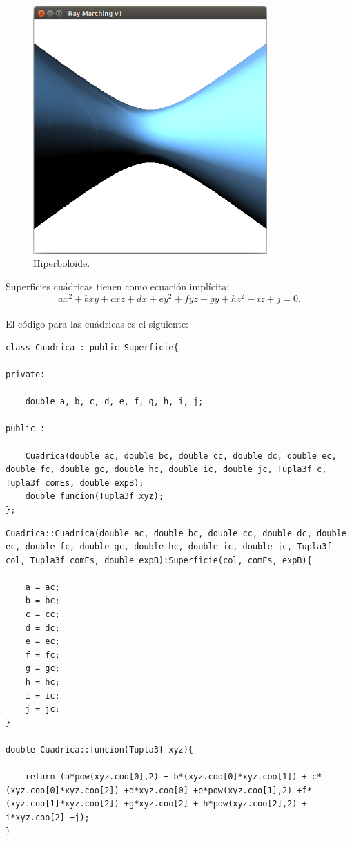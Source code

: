 \begin{figure}[h]
	\begin{center}
		\includegraphics[width=0.8\textwidth]{imagenes/cuadrica.png}
	\end{center}
	\caption{Hiperboloide.}
	\label{fig:etiq_123}
\end{figure}


Superficies cuádricas tienen como ecuación implícita:
${ }$\\
\[
ax^2 + bxy + cxz +dx +ey^2 +fyz +gy + hz^2 + iz +j = 0.
\]
${ }$\\

El código para las cuádricas es el siguiente:
${ }$\\

\begin{lstlisting}[style=Consola]
class Cuadrica : public Superficie{

private:

	double a, b, c, d, e, f, g, h, i, j;

public :

	Cuadrica(double ac, double bc, double cc, double dc, double ec, double fc, double gc, double hc, double ic, double jc, Tupla3f c, Tupla3f comEs, double expB);
	double funcion(Tupla3f xyz);
};
\end{lstlisting}

\begin{lstlisting}[style=Consola]
Cuadrica::Cuadrica(double ac, double bc, double cc, double dc, double ec, double fc, double gc, double hc, double ic, double jc, Tupla3f col, Tupla3f comEs, double expB):Superficie(col, comEs, expB){

	a = ac;
	b = bc;
	c = cc;
	d = dc;
	e = ec;
	f = fc;
	g = gc;
	h = hc;
	i = ic;
	j = jc;
}

double Cuadrica::funcion(Tupla3f xyz){

	return (a*pow(xyz.coo[0],2) + b*(xyz.coo[0]*xyz.coo[1]) + c*(xyz.coo[0]*xyz.coo[2]) +d*xyz.coo[0] +e*pow(xyz.coo[1],2) +f*(xyz.coo[1]*xyz.coo[2]) +g*xyz.coo[2] + h*pow(xyz.coo[2],2) + i*xyz.coo[2] +j);
}
\end{lstlisting}





